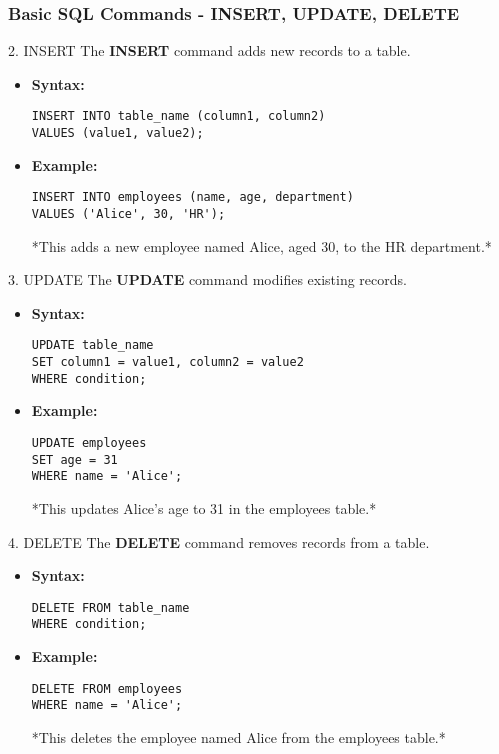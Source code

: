 \documentclass[aspectratio=169]{beamer}
\begin{document}
\begin{frame}[fragile]
    \frametitle{Basic SQL Commands - INSERT, UPDATE, DELETE}
    \begin{block}{2. INSERT}
        The \textbf{INSERT} command adds new records to a table.
    \end{block}
    
    \begin{itemize}
        \item \textbf{Syntax:}
        \begin{lstlisting}
INSERT INTO table_name (column1, column2) 
VALUES (value1, value2);
        \end{lstlisting}
        
        \item \textbf{Example:}
        \begin{lstlisting}
INSERT INTO employees (name, age, department) 
VALUES ('Alice', 30, 'HR');
        \end{lstlisting}
        *This adds a new employee named Alice, aged 30, to the HR department.*
    \end{itemize}

    \begin{block}{3. UPDATE}
        The \textbf{UPDATE} command modifies existing records.
    \end{block}
    
    \begin{itemize}
        \item \textbf{Syntax:}
        \begin{lstlisting}
UPDATE table_name 
SET column1 = value1, column2 = value2 
WHERE condition;
        \end{lstlisting}
        
        \item \textbf{Example:}
        \begin{lstlisting}
UPDATE employees 
SET age = 31 
WHERE name = 'Alice';
        \end{lstlisting}
        *This updates Alice's age to 31 in the employees table.*
    \end{itemize}
    
    \begin{block}{4. DELETE}
        The \textbf{DELETE} command removes records from a table.
    \end{block}
    
    \begin{itemize}
        \item \textbf{Syntax:}
        \begin{lstlisting}
DELETE FROM table_name 
WHERE condition;
        \end{lstlisting}
        
        \item \textbf{Example:}
        \begin{lstlisting}
DELETE FROM employees 
WHERE name = 'Alice';
        \end{lstlisting}
        *This deletes the employee named Alice from the employees table.*
    \end{itemize}
\end{frame}
\end{document}
